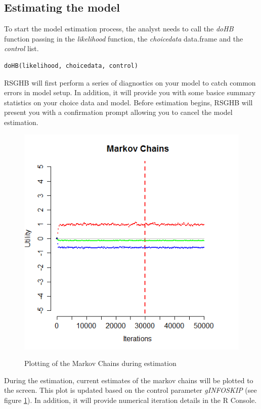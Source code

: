 \documentclass{article}\usepackage[]{graphicx}\usepackage[]{color}
\begin{document}
\subsection*{Estimating the model}

To start the model estimation process, the analyst needs to call the \emph{doHB} function passing in the \emph{likelihood} function, the \emph{choicedata} data.frame and the \emph{control} list. 

\begin{verbatim}
doHB(likelihood, choicedata, control)
\end{verbatim}

RSGHB will first perform a series of diagnostics on your model to catch common errors in model setup. In addition, it will provide you with some basice summary statistics on your choice data and model. Before estimation begins, RSGHB will present you with a confirmation prompt allowing you to cancel the model estimation.

\begin{figure}
\caption{Plotting of the Markov Chains during estimation}
\includegraphics[scale=0.50]{MNL_markovChains.png}
\label{MarkovChain}
\end{figure}

During the estimation, current estimates of the markov chains will be plotted to the screen. This plot is updated based on the control parameter \emph{gINFOSKIP} (see figure \ref{MarkovChain}). In addition, it will provide numerical iteration details in the R Console.
\end{document}
